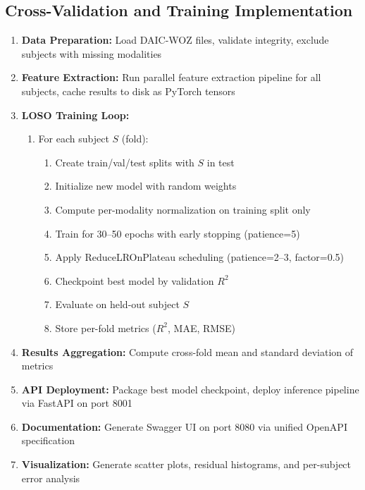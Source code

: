 \documentclass[12pt]{article}
\begin{document}

	\subsection{Cross-Validation and Training Implementation}

	\begin{enumerate}
		\item \textbf{Data Preparation:} Load DAIC-WOZ files, validate integrity, exclude subjects with missing modalities

		\item \textbf{Feature Extraction:} Run parallel feature extraction pipeline for all subjects, cache results to disk as PyTorch tensors

		\item \textbf{LOSO Training Loop:}
		\begin{enumerate}
			\item For each subject $S$ (fold):
			\begin{enumerate}
				\item Create train/val/test splits with $S$ in test
				\item Initialize new model with random weights
				\item Compute per-modality normalization on training split only
				\item Train for 30--50 epochs with early stopping (patience=5)
				\item Apply ReduceLROnPlateau scheduling (patience=2--3, factor=0.5)
				\item Checkpoint best model by validation $R^2$
				\item Evaluate on held-out subject $S$
				\item Store per-fold metrics ($R^2$, MAE, RMSE)
			\end{enumerate}
		\end{enumerate}

		\item \textbf{Results Aggregation:} Compute cross-fold mean and standard deviation of metrics

		\item \textbf{API Deployment:} Package best model checkpoint, deploy inference pipeline via FastAPI on port 8001

		\item \textbf{Documentation:} Generate Swagger UI on port 8080 via unified OpenAPI specification

		\item \textbf{Visualization:} Generate scatter plots, residual histograms, and per-subject error analysis
	\end{enumerate}
\end{document}
